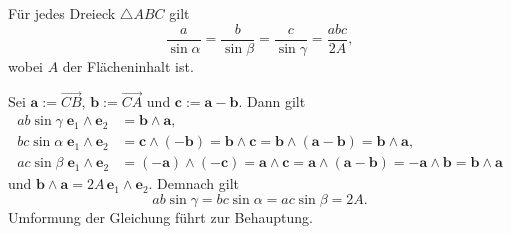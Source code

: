 \newpage
\begin{Satz}[Sinussatz]
Für jedes Dreieck $\triangle ABC$ gilt
\[\frac{a}{\sin\alpha} = \frac{b}{\sin\beta} = \frac{c}{\sin\gamma}
= \frac{abc}{2A},\]
wobei $A$ der Flächeninhalt ist.
\end{Satz}
\begin{Beweis}
Sei $\mathbf a := \overrightarrow{CB}$, $\mathbf b:= \overrightarrow{CA}$
und $\mathbf c := \mathbf a-\mathbf b$. Dann gilt
\begin{align*}
ab\sin\gamma\;\mathbf e_1\wedge\mathbf e_2 &= \mathbf b\wedge\mathbf a,\\
bc\sin\alpha\;\mathbf e_1\wedge\mathbf e_2 &= \mathbf c\wedge(-\mathbf b)
= \mathbf b\wedge\mathbf c = \mathbf b\wedge (\mathbf a-\mathbf b)
= \mathbf b\wedge\mathbf a,\\
ac\sin\beta\;\mathbf e_1\wedge\mathbf e_2 &= (-\mathbf a)\wedge (-\mathbf c)
= \mathbf a\wedge\mathbf c
= \mathbf a\wedge(\mathbf a-\mathbf b)
= -\mathbf a\wedge\mathbf b = \mathbf b\wedge\mathbf a
\end{align*}
und $\mathbf b\wedge\mathbf a = 2A\,\mathbf e_1\wedge\mathbf e_2$.
Demnach gilt
\[ab\sin\gamma = bc\sin\alpha = ac\sin\beta = 2A.\]
Umformung der Gleichung führt zur Behauptung.\;\qedsymbol
\end{Beweis}
